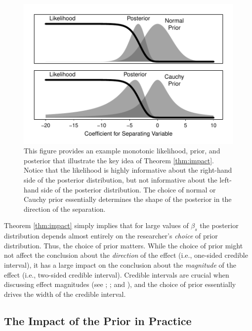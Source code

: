 \documentclass[12pt]{article}
\begin{document}
\begin{figure}[H]
\begin{center}
\includegraphics[scale = .8]{figs/thm-1-illustrated.pdf}
\caption{This figure provides an example monotonic likelihood, prior, and posterior that illustrate the key idea of Theorem \ref{thm:impact}. Notice that the likelihood is highly informative about the right-hand side of the posterior distribution, but not informative about the left-hand side of the posterior distribution. The choice of normal or Cauchy prior essentially determines the shape of the posterior in the direction of the separation.}\label{fig:thm-1-illustrated}
\end{center}
\end{figure}

Theorem \ref{thm:impact} simply implies that for large values of $\beta_s$ the posterior distribution depends almost entirely on the researcher's \emph{choice} of prior distribution. 
Thus, the choice of prior matters. 
While the choice of prior might not affect the conclusion about the \emph{direction} of the effect (i.e., one-sided credible interval), it has a large impact on the conclusion about the \emph{magnitude} of the effect (i.e., two-sided credible interval).
Credible intervals are crucial when discussing effect magnitudes (see \citealt{KingTomzWittenberg2000}; \citealt{Rainey2014a}; and \citealt{Gross2014}), and the choice of prior essentially drives the width of the credible interval.

\subsection*{The Impact of the Prior in Practice}
\end{document}
